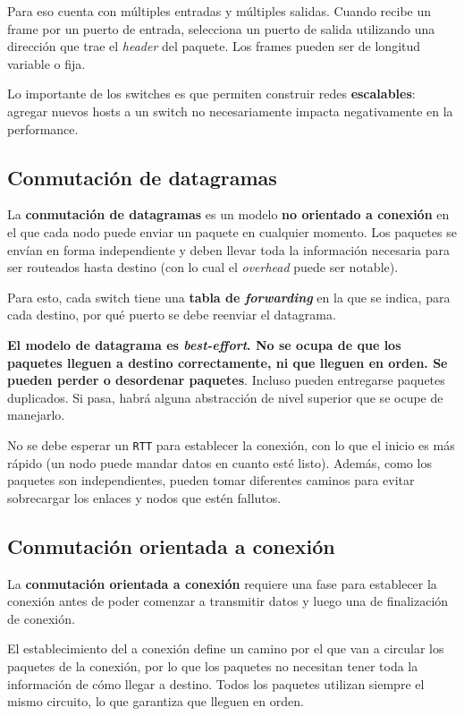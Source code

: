 \documentclass[]{article}
\begin{document}
Para eso cuenta con múltiples entradas y múltiples salidas. Cuando recibe un frame por un puerto de entrada, selecciona un puerto de salida utilizando una dirección que trae el \emph{header} del paquete. Los frames pueden ser de longitud variable o fija.


Lo importante de los switches es que permiten construir redes \textbf{escalables}: agregar nuevos hosts a un switch no necesariamente impacta negativamente en la performance.

\subsection{Conmutación de datagramas}
La \textbf{conmutación de datagramas} es un modelo \textbf{no orientado a conexión} en el que cada nodo puede enviar un paquete en cualquier momento. Los paquetes se envían en forma independiente y deben llevar toda la información necesaria para ser routeados hasta destino (con lo cual el \emph{overhead} puede ser notable).

Para esto, cada switch tiene una \textbf{tabla de \emph{forwarding}} en la que se indica, para cada destino, por qué puerto se debe reenviar el datagrama.


\textbf{El modelo de datagrama es \emph{best-effort}. No se ocupa de que los paquetes lleguen a destino correctamente, ni que lleguen en orden. Se pueden perder o desordenar paquetes}. Incluso pueden entregarse paquetes duplicados. Si pasa, habrá alguna abstracción de nivel superior que se ocupe de manejarlo. %

No se debe esperar un \texttt{RTT} para establecer la conexión, con lo que el inicio es más rápido (un nodo puede mandar datos en cuanto esté listo). Además, como los paquetes son independientes, pueden tomar diferentes caminos para evitar sobrecargar los enlaces y nodos que estén fallutos.

\subsection{Conmutación orientada a conexión}
La \textbf{conmutación orientada a conexión} requiere una fase para establecer la conexión antes de poder comenzar a transmitir datos y luego una de finalización de conexión.

El establecimiento del a conexión define un camino por el que van a circular los paquetes de la conexión, por lo que los paquetes no necesitan tener toda la información de cómo llegar a destino. Todos los paquetes utilizan siempre el mismo circuito, lo que garantiza que lleguen en orden.
\end{document}
